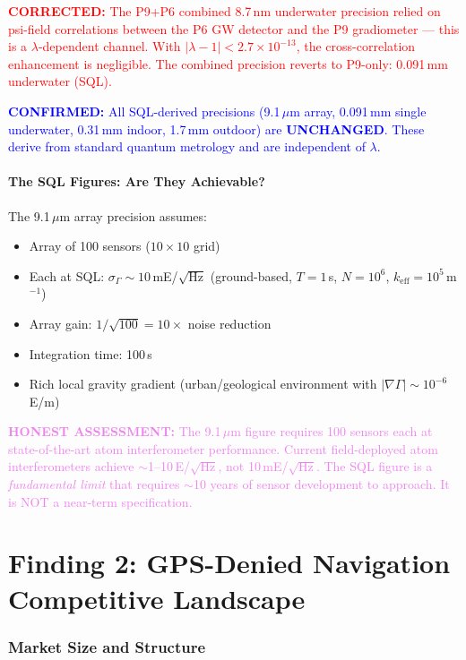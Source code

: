 \documentclass[11pt]{article}
\theoremstyle{definition}
\theoremstyle{remark}
\newcommand{\ee}[1]{\times10^{#1}}
\newcommand{\confirmed}[1]{\textcolor{blue}{\textbf{CONFIRMED:} #1}}
\newcommand{\corrected}[1]{\textcolor{red}{\textbf{CORRECTED:} #1}}
\newcommand{\honest}[1]{\textcolor{violet}{\textbf{HONEST ASSESSMENT:} #1}}
\begin{document}
\corrected{The P9+P6 combined 8.7\,nm underwater precision relied on
psi-field correlations between the P6 GW detector and the P9 gradiometer
--- this is a $\lambda$-dependent channel. With $|\lambda-1| < 2.7\ee{-13}$,
the cross-correlation enhancement is negligible. The combined precision
reverts to P9-only: 0.091\,mm underwater (SQL).}

\confirmed{All SQL-derived precisions (9.1\,$\mu$m array, 0.091\,mm
single underwater, 0.31\,mm indoor, 1.7\,mm outdoor) are
\textbf{UNCHANGED}. These derive from standard quantum metrology and
are independent of $\lambda$.}

\subsection{The SQL Figures: Are They Achievable?}

The 9.1\,$\mu$m array precision assumes:
\begin{itemize}
  \item Array of 100 sensors ($10 \times 10$ grid)
  \item Each at SQL: $\sigma_\Gamma \sim 10$\,mE/$\sqrt{\text{Hz}}$
    (ground-based, $T = 1$\,s, $N = 10^6$, $k_{\text{eff}} = 10^5$\,m$^{-1}$)
  \item Array gain: $1/\sqrt{100} = 10\times$ noise reduction
  \item Integration time: 100\,s
  \item Rich local gravity gradient (urban/geological environment with
    $|\nabla\Gamma| \sim 10^{-6}$\,E/m)
\end{itemize}

\honest{The 9.1\,$\mu$m figure requires 100 sensors each at
state-of-the-art atom interferometer performance. Current field-deployed
atom interferometers achieve $\sim$1--10\,E/$\sqrt{\text{Hz}}$, not
10\,mE/$\sqrt{\text{Hz}}$. The SQL figure is a \emph{fundamental limit}
that requires $\sim$10 years of sensor development to approach. It is
NOT a near-term specification.}

\part{Finding 2: GPS-Denied Navigation Competitive Landscape}
\label{part:competitive}

\section{Market Size and Structure}
\label{sec:market}
\end{document}
